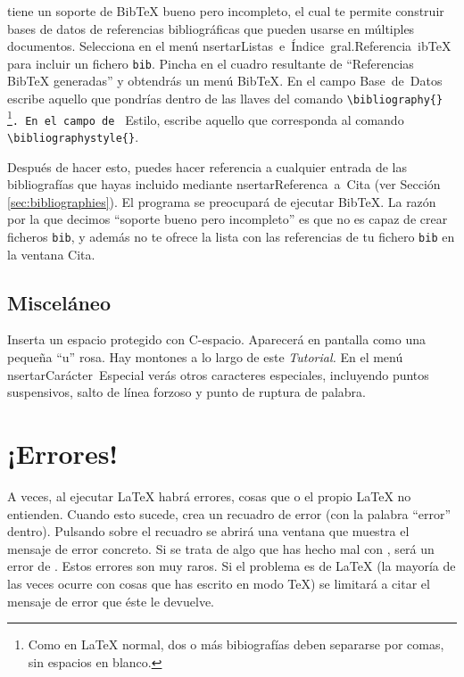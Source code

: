 \LyX{} tiene un soporte de Bib\TeX{} bueno pero incompleto, el cual
te permite construir bases de datos de referencias bibliográficas
que pueden usarse en múltiples documentos. Selecciona en el menú \textsf{}\textsf{nsertar\lyxarrow{}Listas~e~Índice~gral.\lyxarrow{}Referencia~}\textsf{}\textsf{ib\TeX{}}
para incluir un fichero \texttt{bib}. Pincha en el cuadro resultante
de {}``Referencias Bib\TeX{} generadas'' y obtendrás un menú \textsf{Bib\TeX{}}.
En el campo \textsf{Base~de~Datos} escribe aquello que pondrías
dentro de las llaves del comando \texttt{\textbackslash{}bibliography\{\}}%
\footnote{Como en \LaTeX{} normal, dos o más bibiografías deben separarse por
comas, sin espacios en blanco.%
}\texttt{. En el campo de } \textsf{Estilo}, escribe aquello que corresponda
al comando \texttt{\textbackslash{}bibliographystyle\{\}}.

Después de hacer esto, puedes hacer referencia a cualquier entrada
de las bibliografías que hayas incluido mediante \textsf{}\textsf{nsertar\lyxarrow{}Referenc}\textsf{}\textsf{a~a~Cita}
(ver Sección \ref{sec:bibliographies}). El programa se preocupará
de ejecutar Bib\TeX{}. La razón por la que decimos {}``soporte bueno
pero incompleto'' es que \LyX{} no es capaz de crear ficheros \texttt{bib},
y además no te ofrece la lista con las referencias de tu fichero \texttt{bib}
en la ventana \textsf{Cita}.


\subsection{Misceláneo}

Inserta un espacio protegido con \textsf{C-espacio}. Aparecerá en
pantalla como una pequeña {}``u'' rosa. Hay montones a lo largo
de este \emph{Tutorial\@.} En el menú \textsf{}\textsf{nsertar\lyxarrow{}Carácter~Especial}
verás otros caracteres especiales, incluyendo puntos suspensivos,
salto de línea forzoso y punto de ruptura de palabra.


\section{¡Errores!}

A veces, al ejecutar \LaTeX{} habrá errores, cosas que \LyX{} o el
propio \LaTeX{} no entienden. Cuando esto sucede, \LyX{} crea un recuadro
de error (con la palabra {}``error'' dentro). Pulsando sobre el
recuadro se abrirá una ventana que muestra el mensaje de error concreto.
Si se trata de algo que has hecho mal con \LyX{}, será un error de
\LyX{}. Estos errores son muy raros. Si el problema es de \LaTeX{}
(la mayoría de las veces ocurre con cosas que has escrito en modo
\TeX{}) \LyX{} se limitará a citar el mensaje de error que éste le
devuelve.
